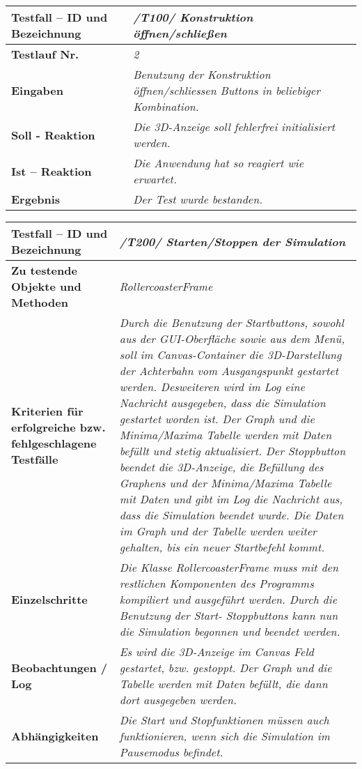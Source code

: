 \begin{longtable}{|p{7cm}|p{10cm}|}
\hline
\textbf{Testfall -- ID und Bezeichnung} & \textit{/T100/ Konstruktion öffnen/schließen} \\
\hline
\textbf{Testlauf Nr.} & \textit{2} \\
\hline
\textbf{Eingaben} & \textit{Benutzung der Konstruktion öffnen/schliessen Buttons in beliebiger Kombination.} \\
\hline
\textbf{Soll - Reaktion} & \textit{ Die 3D-Anzeige soll fehlerfrei initialisiert werden.} \\
\hline
\textbf{Ist -- Reaktion} & \textit{ Die Anwendung hat so reagiert wie erwartet.} \\
\hline
\textbf{Ergebnis} & \textit{Der Test wurde bestanden.} \\
\hline
\end{longtable}


\begin{longtable}{|p{7cm}|p{10cm}|}
\hline
\textbf{Testfall -- ID und Bezeichnung} &  \textit{/T200/ Starten/Stoppen der Simulation} \\
\hline
\textbf{Zu testende Objekte und Methoden} &  \textit{RollercoasterFrame}
\\
\hline
\textbf{Kriterien für erfolgreiche bzw. fehlgeschlagene Testfälle} &
\textit{Durch die Benutzung der Startbuttons, sowohl aus der GUI-Oberfläche sowie aus dem Menü, soll im Canvas-Container die 3D-Darstellung der Achterbahn vom Ausgangspunkt gestartet werden.
Desweiteren wird im Log eine Nachricht ausgegeben, dass die Simulation gestartet worden ist. Der Graph und die Minima/Maxima Tabelle werden mit Daten befüllt und stetig aktualisiert.
Der Stoppbutton beendet die 3D-Anzeige, die Befüllung des Graphens und der Minima/Maxima Tabelle mit Daten und gibt im Log die Nachricht aus, dass die Simulation beendet wurde. Die Daten im Graph
und der Tabelle werden weiter gehalten, bis ein neuer Startbefehl kommt.} \\
\hline
\textbf{Einzelschritte} &  \textit{Die Klasse RollercoasterFrame muss mit den restlichen Komponenten des Programms kompiliert und ausgeführt werden. Durch die Benutzung der Start- Stoppbuttons
kann nun die Simulation begonnen und beendet werden.} \\
\hline
\textbf{Beobachtungen / Log} &  \textit{Es wird die 3D-Anzeige im Canvas Feld gestartet, bzw. gestoppt. Der Graph und die Tabelle werden mit Daten befüllt, die dann dort ausgegeben werden.} \\
\hline
\textbf{Abhängigkeiten} &  \textit{Die Start und Stopfunktionen müssen auch funktionieren, wenn sich die Simulation im Pausemodus befindet.} \\
\hline
 \end{longtable}



